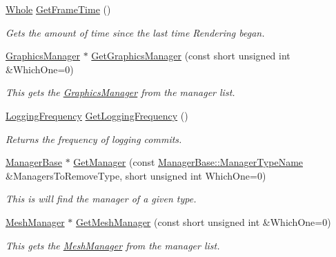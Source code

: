 \begin{DoxyCompactItemize}
\hyperlink{namespaceMezzanine_adcbb6ce6d1eb4379d109e51171e2e493}{Whole} \hyperlink{classMezzanine_1_1World_aa2f076a12d41fa662b5ee81d83ea165b}{GetFrameTime} ()
\begin{DoxyCompactList}\small\item\em Gets the amount of time since the last time Rendering began. \item\end{DoxyCompactList}\item 
\hyperlink{classMezzanine_1_1GraphicsManager}{GraphicsManager} $\ast$ \hyperlink{classMezzanine_1_1World_a93ffca4d93a2b2bdda4edf45fc3cc1f0}{GetGraphicsManager} (const short unsigned int \&WhichOne=0)
\begin{DoxyCompactList}\small\item\em This gets the \hyperlink{classMezzanine_1_1GraphicsManager}{GraphicsManager} from the manager list. \item\end{DoxyCompactList}\item 
\hyperlink{classMezzanine_1_1World_a535c832832bbdebcdc623c3472a32e25}{LoggingFrequency} \hyperlink{classMezzanine_1_1World_a78b3114180552852368491862f35904a}{GetLoggingFrequency} ()
\begin{DoxyCompactList}\small\item\em Returns the frequency of logging commits. \item\end{DoxyCompactList}\item 
\hyperlink{classMezzanine_1_1ManagerBase}{ManagerBase} $\ast$ \hyperlink{classMezzanine_1_1World_af372567d368cb98d1c6a8920a7e31fb7}{GetManager} (const \hyperlink{classMezzanine_1_1ManagerBase_a08cecf5169cad3e82be81a3a159b0b6e}{ManagerBase::ManagerTypeName} \&ManagersToRemoveType, short unsigned int WhichOne=0)
\begin{DoxyCompactList}\small\item\em This is will find the manager of a given type. \item\end{DoxyCompactList}\item 
\hyperlink{classMezzanine_1_1MeshManager}{MeshManager} $\ast$ \hyperlink{classMezzanine_1_1World_a8acc20c71ce08de18214103f16096462}{GetMeshManager} (const short unsigned int \&WhichOne=0)
\begin{DoxyCompactList}\small\item\em This gets the \hyperlink{classMezzanine_1_1MeshManager}{MeshManager} from the manager list. \item\end{DoxyCompactList}\item 

\end{DoxyCompactItemize}
